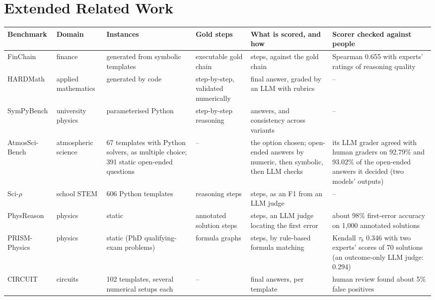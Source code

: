 
\section{Extended Related Work}
\label{app:related}

\begin{table}[t]
\centering
\footnotesize
\begin{tabular}{p{2.5cm}p{1.9cm}p{2.3cm}p{2.1cm}p{3.4cm}p{3.3cm}}
\toprule
\textbf{Benchmark} & \textbf{Domain} & \textbf{Instances} & \textbf{Gold steps} & \textbf{What is scored, and how} & \textbf{Scorer checked against people} \\
\midrule
FinChain \citep{xie2025finchain} & finance & generated from symbolic templates & executable gold chain & steps, against the gold chain & Spearman 0.655 with experts' ratings of reasoning quality \\
HARDMath \citep{fan2024hardmath} & applied mathematics & generated by code & step-by-step, validated numerically & final answer, graded by an LLM with rubrics & -- \\
SymPyBench \citep{imani2025sympybench} & university physics & parameterised Python & step-by-step reasoning & answers, and consistency across variants & -- \\
AtmosSci-Bench \citep{li2025atmosscibench} & atmospheric science & 67 templates with Python solvers, as multiple choice; 391 static open-ended questions & -- & the option chosen; open-ended answers by numeric, then symbolic, then LLM checks & its LLM grader agreed with human graders on 92.79\% and 93.02\% of the open-ended answers it decided (two models' outputs) \\
Sci-$\rho$ \citep{azmi2026scirho} & school STEM & 606 Python templates & reasoning steps & steps, as an F1 from an LLM judge & -- \\
PhysReason \citep{zhang2025physreason} & physics & static & annotated solution steps & steps, an LLM judge locating the first error & about 98\% first-error accuracy on 1,000 annotated solutions \\
PRISM-Physics \citep{zhao2026prismphysics} & physics & static (PhD qualifying-exam problems) & formula graphs & steps, by rule-based formula matching & Kendall $\tau_b$ 0.346 with two experts' scores of 70 solutions (an outcome-only LLM judge: 0.294) \\
CIRCUIT \citep{skelic2025circuit} & circuits & 102 templates, several numerical setups each & -- & final answers, per template & human review found about 5\% false positives \\

\end{tabular}
\end{table}
